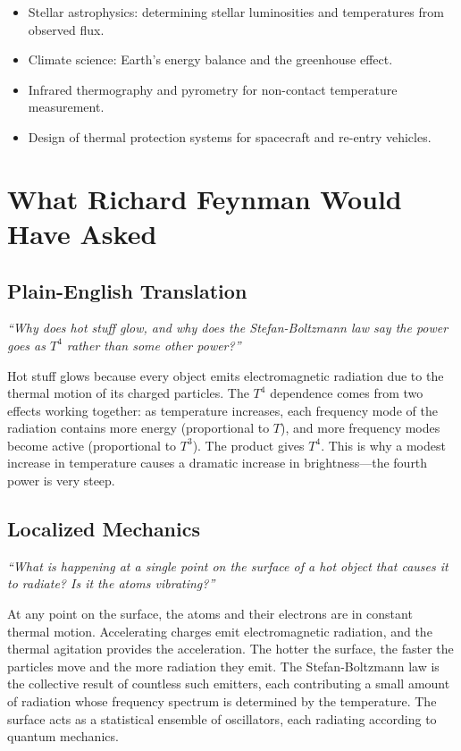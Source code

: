\begin{itemize}
    \item Stellar astrophysics: determining stellar luminosities and temperatures from observed flux.
    \item Climate science: Earth's energy balance and the greenhouse effect.
    \item Infrared thermography and pyrometry for non-contact temperature measurement.
    \item Design of thermal protection systems for spacecraft and re-entry vehicles.
\end{itemize}
\section*{What Richard Feynman Would Have Asked}

\subsection*{Plain-English Translation}
\textit{``Why does hot stuff glow, and why does the Stefan-Boltzmann law say the power goes as $T^4$ rather than some other power?''}

Hot stuff glows because every object emits electromagnetic radiation due to the thermal motion of its charged particles. The $T^4$ dependence comes from two effects working together: as temperature increases, each frequency mode of the radiation contains more energy (proportional to $T$), and more frequency modes become active (proportional to $T^3$). The product gives $T^4$. This is why a modest increase in temperature causes a dramatic increase in brightness---the fourth power is very steep.

\subsection*{Localized Mechanics}
\textit{``What is happening at a single point on the surface of a hot object that causes it to radiate? Is it the atoms vibrating?''}

At any point on the surface, the atoms and their electrons are in constant thermal motion. Accelerating charges emit electromagnetic radiation, and the thermal agitation provides the acceleration. The hotter the surface, the faster the particles move and the more radiation they emit. The Stefan-Boltzmann law is the collective result of countless such emitters, each contributing a small amount of radiation whose frequency spectrum is determined by the temperature. The surface acts as a statistical ensemble of oscillators, each radiating according to quantum mechanics.

